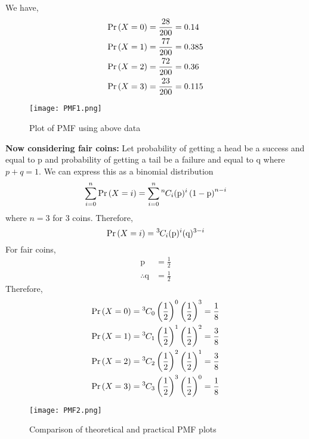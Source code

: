 \documentclass[journal,12pt,two column]{IEEEtran}
\begin{document}
We have,
\begin{align}
\Pr\left(X = 0\right) &= \frac{28}{200} = 0.14 \\
\Pr\left(X = 1\right) &= \frac{77}{200} = 0.385 \\
\Pr\left(X = 2\right) &= \frac{72}{200} = 0.36 \\
\Pr\left(X = 3\right) &= \frac{23}{200} = 0.115 
\end{align}
\begin{figure}[ht!]
     \centering
     \texttt{[image: PMF1.png]}
     \caption{Plot of PMF using above data}
     \label{fig:Figure 1}
\end{figure}

\textbf{Now considering fair coins:}
Let probability of getting a head be a success and equal to p and probability of getting a tail be a failure and equal to q where $p+q = 1$. We can express this as a binomial distribution
\begin{equation}
   \sum_{i=0}^{n} \Pr\left(X = i\right) =  \sum_{i=0}^{n} {{}^{n}\mkern-1muC_{i}}(\text{p})^i\left(1-\text{p}\right)^{n-i}
\end{equation}
where $n = 3$ for 3 coins. Therefore,
\begin{equation}
\Pr\left(X = i\right) = {{}^{3}\mkern-1muC_{i}} (\text{p})^i (\text{q})^{3-i}    
\end{equation}
For fair coins, 
\begin{align}
   \text{p} &= \frac{1}{2}\\
  \therefore  \text{q} &= \frac{1}{2}
\end{align}
Therefore,
\begin{align}
    \Pr\left(X = 0\right) &= {{}^{3}\mkern-1muC_{0}}\left(\frac{1}{2}\right)^0\left(\frac{1}{2}\right)^3 = \frac{1}{8}\\
    \Pr\left(X = 1\right) &= {{}^{3}\mkern-1muC_{1}}\left(\frac{1}{2}\right)^1\left(\frac{1}{2}\right)^2 = \frac{3}{8}\\
    \Pr\left(X = 2\right) &= {{}^{3}\mkern-1muC_{2}}\left(\frac{1}{2}\right)^2\left(\frac{1}{2}\right)^1 = \frac{3}{8}\\
    \Pr\left(X = 3\right) &= {{}^{3}\mkern-1muC_{3}}\left(\frac{1}{2}\right)^3\left(\frac{1}{2}\right)^0 = \frac{1}{8}
    \end{align}
\begin{figure}[!ht]
     \centering
     \texttt{[image: PMF2.png]}
     \caption{Comparison of theoretical and practical PMF plots}
     \label{fig:Figure 2}
\end{figure}
\end{document}
